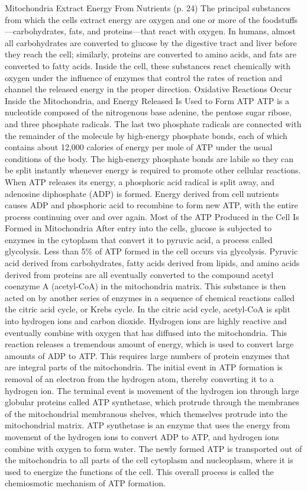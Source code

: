 Mitochondria Extract Energy From Nutrients (p. 24) The principal substances from which the cells extract energy are oxygen and one or more of the foodstuffs—carbohydrates, fats, and proteins—that react with oxygen. In humans, almost all carbohydrates are converted to glucose by the digestive tract and liver before they reach the cell; similarly, proteins are converted to amino acids, and fats are converted to fatty acids. Inside the cell, these substances react chemically with oxygen under the influence of enzymes that control the rates of reaction and channel the released energy in the proper direction.
Oxidative Reactions Occur Inside the Mitochondria, and Energy Released Is Used to Form ATP ATP is a nucleotide composed of the nitrogenous base adenine, the pentose sugar ribose, and three phosphate radicals. The last two phosphate radicals are connected with the remainder of the molecule by high-energy phosphate bonds, each of which contains about 12,000 calories of energy per mole of ATP under the usual conditions of the body. The high-energy phosphate bonds are labile so they can be split instantly whenever energy is required to promote other cellular reactions. When ATP releases its energy, a phosphoric acid radical is split away, and adenosine diphosphate (ADP) is formed. Energy derived from cell nutrients causes ADP and phosphoric acid to recombine to form new ATP, with the entire process continuing over and over again. Most of the ATP Produced in the Cell Is Formed in Mitochondria After entry into the cells, glucose is subjected to enzymes in the cytoplasm that convert it to pyruvic acid, a process called glycolysis. Less than 5\% of ATP formed in the cell occurs via glycolysis. Pyruvic acid derived from carbohydrates, fatty acids derived from lipids, and amino acids derived from proteins are all eventually converted to the compound acetyl coenzyme A (acetyl-CoA) in the mitochondria matrix. This substance is then acted on by another series of enzymes in a sequence of chemical reactions called the citric acid cycle, or Krebs cycle. In the citric acid cycle, acetyl-CoA is split into hydrogen ions and carbon dioxide. Hydrogen ions are highly reactive and eventually combine with oxygen that has diffused into the mitochondria. This reaction releases a tremendous amount of energy, which is used to convert large amounts of ADP to ATP. This requires large numbers of protein enzymes that are integral parts of the mitochondria. The initial event in ATP formation is removal of an electron from the hydrogen atom, thereby converting it to a hydrogen ion. The terminal event is movement of the hydrogen ion through large globular proteins called ATP synthetase, which protrude through the membranes of the mitochondrial membranous shelves, which themselves protrude into the mitochondrial matrix. ATP synthetase is an enzyme that uses the energy from movement of the hydrogen ions to convert ADP to ATP, and hydrogen ions combine with oxygen to form water. The newly formed ATP is transported out of the mitochondria to all parts of the cell cytoplasm and nucleoplasm, where it is used to energize the functions of the cell. This overall process is called the chemiosmotic mechanism of ATP formation.



